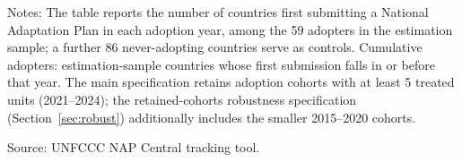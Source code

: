 \begin{table}[H]
\centering
\caption{NAP adoption cohorts}
\label{tab:nap_cohorts_app}
\par\vspace{4pt}
\begin{minipage}{\linewidth}\footnotesize
Notes: The table reports the number of countries first submitting a National Adaptation Plan in each adoption year, among the 59 adopters in the estimation sample; a further 86 never-adopting countries serve as controls. Cumulative adopters: estimation-sample countries whose first submission falls in or before that year. The main specification retains adoption cohorts with at least 5 treated units (2021--2024); the retained-cohorts robustness specification (Section~\ref{sec:robust}) additionally includes the smaller 2015--2020 cohorts.\par
Source: UNFCCC NAP Central tracking tool.
\end{minipage}
\end{table}
